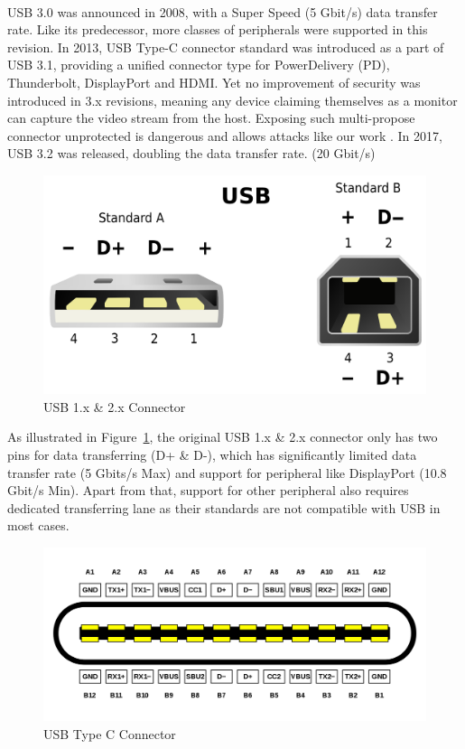 \noindent{}\\
USB 3.0\cite{usb30} was announced in 2008, with a Super Speed (5 Gbit/s) data transfer rate. Like its predecessor, more classes of peripherals were supported in this revision. In 2013, USB Type-C connector standard was introduced as a part of USB 3.1\cite{usb31}, providing a unified connector type for PowerDelivery (PD), Thunderbolt, DisplayPort and HDMI.  Yet no improvement of security was introduced in 3.x revisions, meaning any device claiming themselves as a monitor can capture the video stream from the host. Exposing such multi-propose connector unprotected is dangerous and allows attacks like our work \tool. In 2017, USB 3.2\cite{usb32} was released, doubling the data transfer rate. (20 Gbit/s)

\noindent{}
\begin{figure}[hbtp]
	\includegraphics[width=\linewidth]{./Figs/usb_conn.png}
	\caption{USB 1.x \& 2.x Connector}
	\label{fig:usb_conn}
\end{figure}
As illustrated in Figure~\ref{fig:usb_conn}, the original USB 1.x \& 2.x connector only has two pins for data transferring (D+ \& D-), which has significantly limited data transfer rate (5 Gbits/s Max) and support for peripheral like DisplayPort (10.8 Gbit/s Min). Apart from that, support for other peripheral also requires dedicated transferring lane as their standards are not compatible with USB in most cases.
\begin{figure}[hbtp]
	\includegraphics[width=\linewidth]{./Figs/usb_c_conn.png}
	\caption{USB Type C Connector}
	\label{fig:usb_c_conn}
\end{figure}

